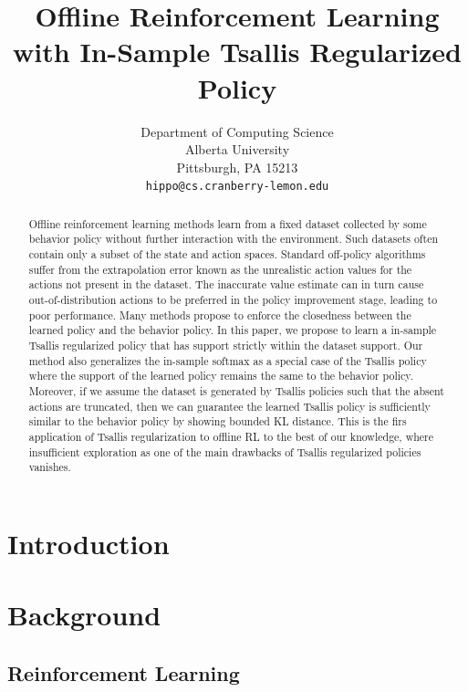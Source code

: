 \documentclass{article}
\title{Offline Reinforcement Learning with In-Sample Tsallis Regularized Policy}
\author{%
  Department of Computing Science\\
  Alberta University\\
  Pittsburgh, PA 15213 \\
  \texttt{hippo@cs.cranberry-lemon.edu} \\
}
\begin{document}

\maketitle

\begin{abstract}
    Offline reinforcement learning methods learn from a fixed dataset collected by some behavior policy without further interaction with the environment.
    Such datasets often contain only a subset of the state and action spaces. 
    Standard off-policy algorithms suffer from the extrapolation error known as the  unrealistic action values for the actions not present in the dataset.
    The inaccurate value estimate can in turn cause out-of-distribution actions to be preferred in the policy improvement stage, leading to poor performance.
    Many methods propose to enforce the closedness between the learned policy and the behavior policy.
    In this paper, we propose to learn a in-sample Tsallis regularized policy that has support strictly within the dataset support. 
    Our method also generalizes the in-sample softmax as a special case of the Tsallis policy where the support of the learned policy remains the same to the behavior policy.
    Moreover, if we assume the dataset is generated by Tsallis policies such that the absent actions are truncated, then we can guarantee the learned Tsallis policy is sufficiently similar to the behavior policy by showing bounded KL distance.
    This is the firs application of Tsallis regularization to offline RL to the best of our knowledge, where insufficient exploration as one of the main drawbacks of Tsallis regularized policies vanishes.
    
\end{abstract}


\section{Introduction}





\section{Background}

\subsection{Reinforcement Learning}
\end{document}
